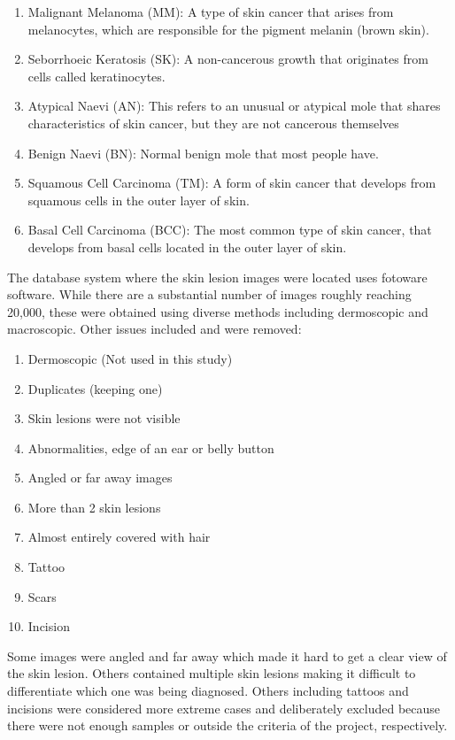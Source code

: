 \begin{enumerate}
	\item Malignant Melanoma (MM): A type of skin cancer that arises from melanocytes, which are responsible for the pigment melanin (brown skin).
	\item Seborrhoeic Keratosis (SK): A non-cancerous growth that originates from cells called keratinocytes.
	\item Atypical Naevi (AN): This refers to an unusual or atypical mole that shares characteristics of skin cancer, but they are not cancerous themselves
	\item Benign Naevi (BN): Normal benign mole that most people have.
	\item Squamous Cell Carcinoma (TM): A form of skin cancer that develops from squamous cells in the outer layer of skin.
	\item Basal Cell Carcinoma (BCC): The most common type of skin cancer, that develops from basal cells located in the outer layer of skin.
\end{enumerate}

The database system where the skin lesion images were located uses fotoware software. While there are a substantial number of images roughly reaching 20,000, these were obtained using diverse methods including dermoscopic and macroscopic. Other issues included and were removed:

\begin{enumerate}
	\item Dermoscopic (Not used in this study)
	\item Duplicates (keeping one)
	\item Skin lesions were not visible
	\item Abnormalities, edge of an ear or belly button
	\item Angled or far away images
	\item More than 2 skin lesions
	\item Almost entirely covered with hair
	\item Tattoo
	\item Scars
	\item Incision
\end{enumerate}

Some images were angled and far away which made it hard to get a clear view of the skin lesion. Others contained multiple skin lesions making it difficult to differentiate which one was being diagnosed. Others including tattoos and incisions were considered more extreme cases and deliberately excluded because there were not enough samples or outside the criteria of the project, respectively.


